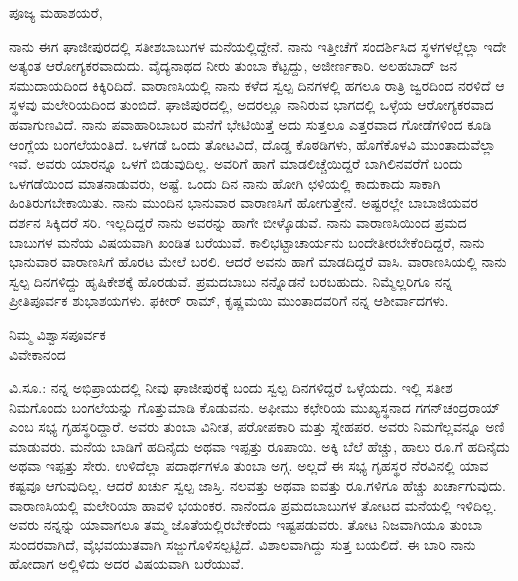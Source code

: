 \vspace{-0.55cm}

\begin{flushright}
{\fontsize{10pt}{10pt}\selectfont{ಘಾಜೀಪುರ\\[-2pt] ೩೦ನೇ ಜನವರಿ ೧೮೯೦}}
\end{flushright}

\noindent
ಪೂಜ್ಯ ಮಹಾಶಯರೆ,

ನಾನು ಈಗ ಘಾಜೀಪುರದಲ್ಲಿ ಸತೀಶಬಾಬುಗಳ ಮನೆಯಲ್ಲಿದ್ದೇನೆ. ನಾನು ಇತ್ತೀಚೆಗೆ ಸಂದರ್ಶಿಸಿದ ಸ್ಥಳಗಳಲ್ಲೆಲ್ಲಾ ಇದೇ ಅತ್ಯಂತ ಆರೋಗ್ಯಕರವಾದುದು. ವೈದ್ಯನಾಥದ ನೀರು ತುಂಬಾ ಕೆಟ್ಟದ್ದು, ಅಜೀರ್ಣಕಾರಿ. ಅಲಹಬಾದ್ ಜನ ಸಮುದಾಯದಿಂದ ಕಿಕ್ಕಿರಿದಿದೆ. ವಾರಾಣಸಿಯಲ್ಲಿ ನಾನು ಕಳೆದ ಸ್ವಲ್ಪ ದಿನಗಳಲ್ಲಿ ಹಗಲೂ ರಾತ್ರಿ ಜ್ವರದಿಂದ ನರಳಿದೆ \enginline{-} ಆ ಸ್ಥಳವು ಮಲೇರಿಯದಿಂದ ತುಂಬಿದೆ. ಘಾಜಿಪುರದಲ್ಲಿ, ಅದರಲ್ಲೂ ನಾನಿರುವ ಭಾಗದಲ್ಲಿ ಒಳ್ಳೆಯ ಆರೋಗ್ಯಕರವಾದ ಹವಾಗುಣವಿದೆ. ನಾನು ಪವಾಹಾರಿಬಾಬರ ಮನೆಗೆ ಭೇಟಿಯಿತ್ತೆ \enginline{-} ಅದು ಸುತ್ತಲೂ ಎತ್ತರವಾದ ಗೋಡೆಗಳಿಂದ ಕೂಡಿ ಆಂಗ್ಲೆಯ ಬಂಗಲೆಯಂತಿದೆ. ಒಳಗಡೆ ಒಂದು ತೋಟವಿದೆ, ದೊಡ್ಡ ಕೊಠಡಿಗಳು, ಹೊಗೆಕೊಳವಿ ಮುಂತಾದುವೆಲ್ಲಾ ಇವೆ. ಅವರು ಯಾರನ್ನೂ ಒಳಗೆ ಬಿಡುವುದಿಲ್ಲ. ಅವರಿಗೆ ಹಾಗೆ ಮಾಡಲಿಚ್ಚೆಯಿದ್ದರೆ ಬಾಗಿಲಿನವರೆಗೆ ಬಂದು ಒಳಗಡೆಯಿಂದ ಮಾತನಾಡುವರು, ಅಷ್ಟೆ. ಒಂದು ದಿನ ನಾನು ಹೋಗಿ ಛಳಿಯಲ್ಲಿ ಕಾದುಕಾದು ಸಾಕಾಗಿ ಹಿಂತಿರುಗಬೇಕಾಯಿತು. ನಾನು ಮುಂದಿನ ಭಾನುವಾರ ವಾರಾಣಸಿಗೆ ಹೋಗುತ್ತೇನೆ. ಅಷ್ಟರಲ್ಲೇ ಬಾಬಾಜಿಯವರ ದರ್ಶನ ಸಿಕ್ಕಿದರೆ ಸರಿ. ಇಲ್ಲದಿದ್ದರೆ ನಾನು ಅವರನ್ನು ಹಾಗೇ ಬೀಳ್ಕೊಡುವೆ. ನಾನು ವಾರಾಣಸಿಯಿಂದ ಪ್ರಮದ ಬಾಬುಗಳ ಮನೆಯ ವಿಷಯವಾಗಿ ಖಂಡಿತ ಬರೆಯುವೆ. ಕಾಲಿಭಟ್ಟಾಚಾರ್ಯನು ಬಂದೇತೀರಬೇಕೆಂದಿದ್ದರೆ, ನಾನು ಭಾನುವಾರ ವಾರಾಣಸಿಗೆ ಹೊರಟ ಮೇಲೆ ಬರಲಿ. ಆದರೆ ಅವನು ಹಾಗೆ ಮಾಡದಿದ್ದರೆ ವಾಸಿ. ವಾರಾಣಸಿಯಲ್ಲಿ ನಾನು ಸ್ವಲ್ಪ ದಿನಗಳಿದ್ದು ಹೃಷಿಕೇಶಕ್ಕೆ ಹೊರಡುವೆ. ಪ್ರಮದಬಾಬು ನನ್ನೊಡನೆ ಬರಬಹುದು. ನಿಮ್ಮೆಲ್ಲರಿಗೂ ನನ್ನ ಪ್ರೀತಿಪೂರ್ವಕ ಶುಭಾಶಯಗಳು. ಫಕೀರ್ ರಾಮ್, ಕೃಷ್ಣಮಯಿ ಮುಂತಾದವರಿಗೆ ನನ್ನ ಆಶೀರ್ವಾದಗಳು.

\vspace{-0.47cm}

\begin{flushright}
ನಿಮ್ಮ ವಿಶ್ವಾಸಪೂರ್ವಕ\\ವಿವೇಕಾನಂದ
\end{flushright}

\vspace{-0.25cm}

ವಿ.ಸೂ.:\enginline{-} ನನ್ನ ಅಭಿಪ್ರಾಯದಲ್ಲಿ ನೀವು ಘಾಜೀಪುರಕ್ಕೆ ಬಂದು ಸ್ವಲ್ಪ ದಿನಗಳಿದ್ದರೆ ಒಳ್ಳೆಯದು. ಇಲ್ಲಿ ಸತೀಶ ನಿಮಗೊಂದು ಬಂಗಲೆಯನ್ನು ಗೊತ್ತುಮಾಡಿ ಕೊಡುವನು. ಅಫೀಮು ಕಛೇರಿಯ ಮುಖ್ಯಸ್ಥನಾದ ಗಗನ್‌ಚಂದ್ರರಾಯ್ ಎಂಬ ಸಭ್ಯ ಗೃಹಸ್ಥರಿದ್ದಾರೆ. ಅವರು ತುಂಬಾ ವಿನೀತ, ಪರೋಪಕಾರಿ ಮತ್ತು ಸ್ನೇಹಪರ. ಅವರು ನಿಮಗೆಲ್ಲವನ್ನೂ ಅಣಿ ಮಾಡುವರು. ಮನೆಯ ಬಾಡಿಗೆ ಹದಿನೈದು ಅಥವಾ ಇಪ್ಪತ್ತು ರೂಪಾಯಿ. ಅಕ್ಕಿ ಬೆಲೆ ಹೆಚ್ಚು, ಹಾಲು ರೂ.ಗೆ ಹದಿನೈದು ಅಥವಾ ಇಪ್ಪತ್ತು ಸೇರು. ಉಳಿದೆಲ್ಲಾ ಪದಾರ್ಥಗಳೂ ತುಂಬಾ ಅಗ್ಗ. ಅಲ್ಲದೆ ಈ ಸಭ್ಯ ಗೃಹಸ್ಥರ ನೆರವಿನಲ್ಲಿ ಯಾವ ಕಷ್ಟವೂ ಆಗುವುದಿಲ್ಲ. ಆದರೆ ಖರ್ಚು ಸ್ವಲ್ಪ ಜಾಸ್ತಿ. ನಲವತ್ತು ಅಥವಾ ಐವತ್ತು ರೂ.ಗಳಿಗೂ ಹೆಚ್ಚು ಖರ್ಚಾಗುವುದು. ವಾರಾಣಸಿಯಲ್ಲಿ ಮಲೇರಿಯಾ ಹಾವಳಿ ಭಯಂಕರ. ನಾನೆಂದೂ ಪ್ರಮದಬಾಬುಗಳ ತೋಟದ ಮನೆಯಲ್ಲಿ ಇಳಿದಿಲ್ಲ. ಅವರು ನನ್ನನ್ನು ಯಾವಾಗಲೂ ತಮ್ಮ ಜೊತೆಯಲ್ಲಿರಬೇಕೆಂದು ಇಷ್ಟಪಡುವರು. ತೋಟ ನಿಜವಾಗಿಯೂ ತುಂಬಾ ಸುಂದರವಾಗಿದೆ, ವೈಭವಯುತವಾಗಿ ಸಜ್ಜುಗೊಳಿಸಲ್ಪಟ್ಟಿದೆ. ವಿಶಾಲವಾಗಿದ್ದು ಸುತ್ತ ಬಯಲಿದೆ. ಈ ಬಾರಿ ನಾನು ಹೋದಾಗ ಅಲ್ಲಿಳಿದು ಅದರ ವಿಷಯವಾಗಿ ಬರೆಯುವೆ.

